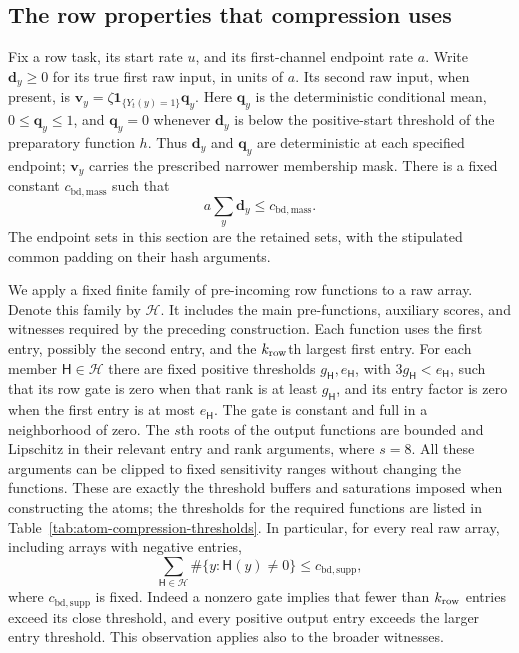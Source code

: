 \documentclass[11pt]{article}
\numberwithin{equation}{section}
\theoremstyle{definition}
\theoremstyle{remark}
\begin{document}
\subsection{The row properties that compression uses}
\label{subsec:buf-interface}
Fix a row task, its start rate $u$, and its first-channel endpoint rate $a$.
Write ${\mathbf{d}}_y\geq0$ for its true first raw input, in units of $a$.  Its second
raw input, when present, is ${\mathbf{v}}_y=\zeta\mathbf1_{\{Y_t(y)=1\}}{\mathbf{q}}_y$.
Here ${\mathbf{q}}_y$ is the deterministic conditional mean, $0\leq {\mathbf{q}}_y\leq1$, and
${\mathbf{q}}_y=0$ whenever ${\mathbf{d}}_y$ is below the positive-start threshold of the
preparatory function $h$.  Thus ${\mathbf{d}}_y$ and ${\mathbf{q}}_y$ are deterministic at each
specified endpoint; ${\mathbf{v}}_y$ carries the prescribed narrower membership mask.
There is a fixed constant ${c_{\mathrm{bd},\mathrm{mass}}}$ such that
\begin{equation}
 a\sum_y {\mathbf{d}}_y\leq {c_{\mathrm{bd},\mathrm{mass}}}.
 \label{eq:buf-mass}
\end{equation}
The endpoint sets in this section are the retained sets, with the stipulated
common padding on their hash arguments.

We apply a fixed finite family of pre-incoming row functions to a raw array.
Denote this family by $\mathcal H$.  It includes the main pre-functions,
auxiliary scores, and witnesses required by the preceding construction.
Each function uses the first entry, possibly the second entry, and the
${k_{\rm row}}$th largest first entry.  For each member ${\mathsf{H}}\in\mathcal H$ there are fixed
positive thresholds $g_{\mathsf{H}},e_{\mathsf{H}}$, with $3g_{\mathsf{H}}<e_{\mathsf{H}}$, such that its row gate is
zero when that rank is at least $g_{\mathsf{H}}$, and its entry factor is zero when the
first entry is at most $e_{\mathsf{H}}$.  The gate is constant and full in a neighborhood
of zero.  The $s$th roots of the output functions are bounded and Lipschitz
in their relevant entry and rank arguments, where $s=8$.  All these arguments
can be clipped to fixed sensitivity ranges without changing the functions.
These are exactly the threshold buffers and saturations imposed when
constructing the atoms; the thresholds for the required functions are
listed in Table~\ref{tab:atom-compression-thresholds}.  In particular,
for every real raw array, including
arrays with negative entries,
\begin{equation}
 \sum_{{\mathsf{H}}\in\mathcal H}\#\{y:{\mathsf{H}}(y)\ne0\}\leq {c_{\mathrm{bd},\mathrm{supp}}},
 \label{eq:buf-row-support}
\end{equation}
where ${c_{\mathrm{bd},\mathrm{supp}}}$ is fixed.  Indeed a nonzero gate implies that fewer
than ${k_{\rm row}}$ entries exceed its close threshold, and every positive output entry
exceeds the larger entry threshold.  This observation applies also to the
broader witnesses.
\end{document}
